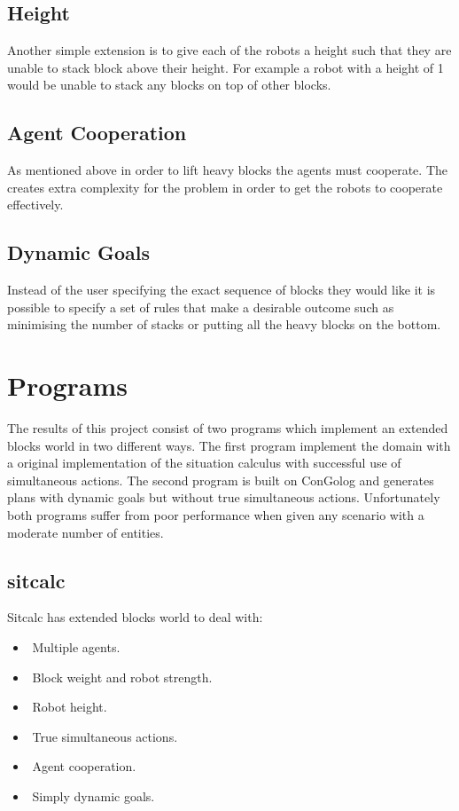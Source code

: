 \documentclass{article}
\begin{document}
\subsection{Height}

Another simple extension is to give each of the robots a height such that they
are unable to stack block above their height. For example a robot with a height
of 1 would be unable to stack any blocks on top of other blocks.

\subsection{Agent Cooperation}

As mentioned above in order to lift heavy blocks the agents must cooperate. The
creates extra complexity for the problem in order to get the robots to cooperate
effectively.

\subsection{Dynamic Goals}

Instead of the user specifying the exact sequence of blocks they would like
it is possible to specify a set of rules that make a desirable outcome such as
minimising the number of stacks or putting all the heavy blocks on the bottom.

\section{Programs}

The results of this project consist of two programs which implement an extended
blocks world in two different ways. The first program implement the domain
with a original implementation of the situation calculus with successful use of
simultaneous actions. The second program is built on ConGolog and generates
plans with dynamic goals but without true simultaneous actions.
Unfortunately both programs suffer from poor performance when given any
scenario with a moderate number of entities.

\subsection{sitcalc}
Sitcalc has extended blocks world to deal with:
\begin{itemize}
	\item Multiple agents.
	\item Block weight and robot strength.
	\item Robot height.
	\item True simultaneous actions.
	\item Agent cooperation.
	\item Simply dynamic goals.
\end{itemize}
\end{document}
